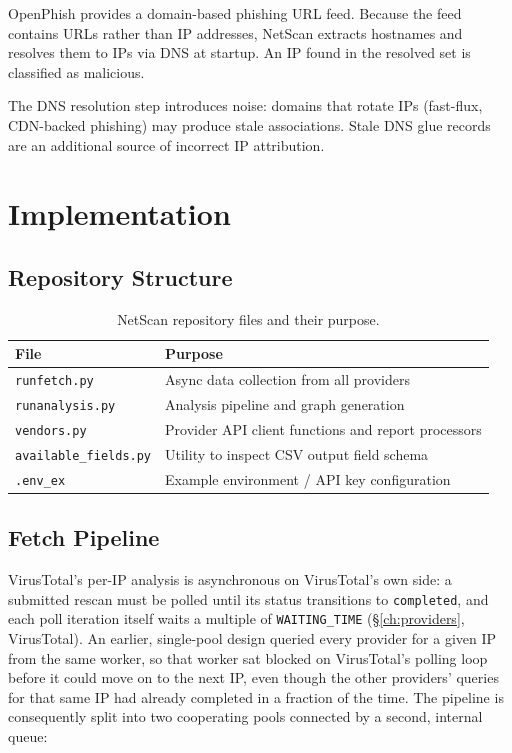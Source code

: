 \documentclass[12pt, a4paper, twoside]{report}
\begin{document}
OpenPhish provides a domain-based phishing URL feed. Because the feed contains URLs rather than
IP addresses, NetScan extracts hostnames and resolves them to IPs via DNS at startup. An IP found
in the resolved set is classified as malicious.

The DNS resolution step introduces noise: domains that rotate IPs (fast-flux, CDN-backed phishing)
may produce stale associations. Stale DNS glue records \cite{zhang2024staleglue} are an additional
source of incorrect IP attribution.

\chapter{Implementation}
\label{ch:implementation}

\section{Repository Structure}

\begin{table}[h]
  \centering
  \caption{NetScan repository files and their purpose.}
  \label{tab:repo}
  \begin{tabularx}{\linewidth}{lX}
    \toprule
    \textbf{File} & \textbf{Purpose} \\
    \midrule
    \texttt{runfetch.py}       & Async data collection from all providers \\
    \texttt{runanalysis.py}    & Analysis pipeline and graph generation \\
    \texttt{vendors.py}        & Provider API client functions and report processors \\
    \texttt{available\_fields.py} & Utility to inspect CSV output field schema \\
    \texttt{.env\_ex}          & Example environment / API key configuration \\
    \bottomrule
  \end{tabularx}
\end{table}

\section{Fetch Pipeline}

VirusTotal's per-IP analysis is asynchronous on VirusTotal's own side: a submitted rescan must be
polled until its status transitions to \texttt{completed}, and each poll iteration itself waits a
multiple of \texttt{WAITING\_TIME} (\S\ref{ch:providers}, VirusTotal). An earlier, single-pool
design queried every provider for a given IP from the same worker, so that worker sat blocked on
VirusTotal's polling loop before it could move on to the next IP, even though the other providers'
queries for that same IP had already completed in a fraction of the time. The pipeline is
consequently split into two cooperating pools connected by a second, internal queue:
\end{document}
